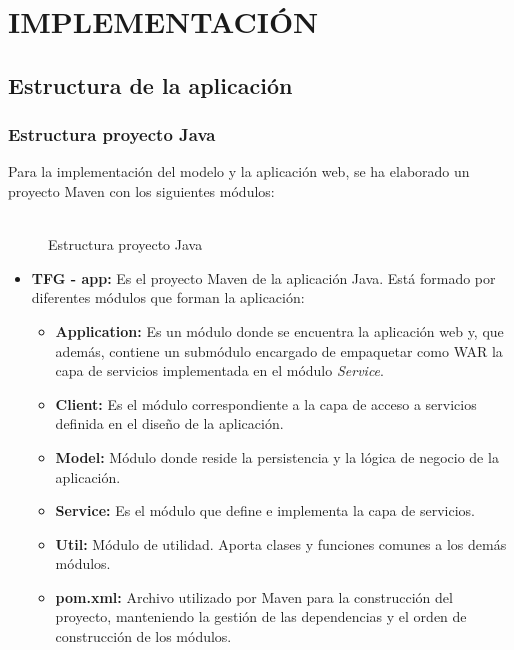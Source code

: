 \chapter[Implementación]{
  \label{chp:implementacion}
  IMPLEMENTACIÓN
}
\thispagestyle{numberingStyle}
\pagestyle{numberingStyle}



\section{Estructura de la aplicación}
\subsection{Estructura proyecto Java}
Para la implementación del modelo y la aplicación web, se ha elaborado un proyecto Maven con los siguientes módulos:
\\
\\

\begin{figure}[H]
\centering
{}
\caption{Estructura proyecto Java}
\end{figure}


\begin{itemize}
	\item \textbf{TFG - app: } Es el proyecto Maven de la aplicación Java. Está formado por diferentes módulos que forman la aplicación:
	\begin{itemize}
		\item \textbf{Application: } Es un módulo donde se encuentra la aplicación web y, que además, contiene un submódulo encargado de empaquetar como WAR la capa de servicios implementada en el módulo \textit{Service}.
		\item \textbf{Client: } Es el módulo correspondiente a la capa de acceso a servicios definida en el diseño de la aplicación. 
		\item \textbf{Model: } Módulo donde reside la persistencia y la lógica de negocio de la aplicación.
		\item \textbf{Service: } Es el módulo que define e implementa la capa de servicios.
		\item \textbf{Util: } Módulo de utilidad. Aporta clases y funciones comunes a los demás módulos.
		\item \textbf{pom.xml: } Archivo utilizado por Maven para la construcción del proyecto, manteniendo la gestión de las dependencias y el orden de construcción de los módulos.
	\end{itemize}
\end{itemize}

